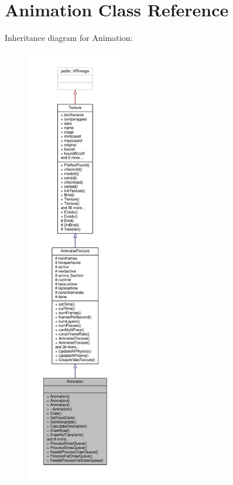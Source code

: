 \hypertarget{classAnimation}{}\section{Animation Class Reference}
\label{classAnimation}


Inheritance diagram for Animation\+:
\nopagebreak
\begin{figure}[H]
\begin{center}
\leavevmode
\includegraphics[height=550pt]{d1/dc2/classAnimation__inherit__graph}
\end{center}
\end{figure}


